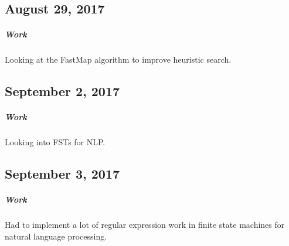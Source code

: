 \documentclass[a4paper]{article}
\begin{document}
\subsection{August 29, 2017}
\subparagraph{Work}
Looking at the FastMap algorithm to improve heuristic search.

\subsection{September 2, 2017}
\subparagraph{Work}
Looking into FSTs for NLP.

\subsection{September 3, 2017}
\subparagraph{Work}
Had to implement a lot of regular expression work in finite state machines for natural language processing.
\end{document}
